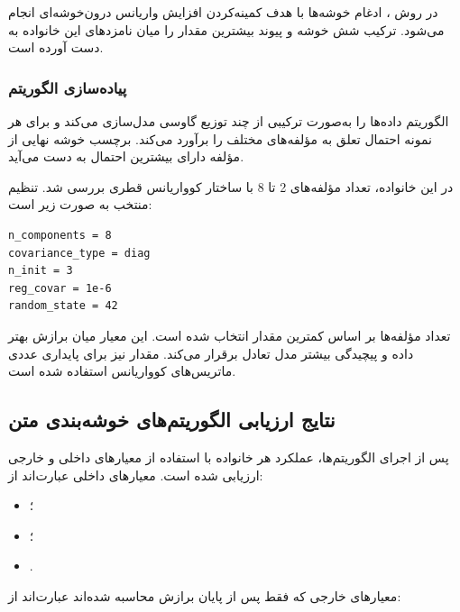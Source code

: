 \documentclass[12pt,a4paper,oneside]{report}
\begin{document}
در روش
،
ادغام خوشه‌ها با هدف کمینه‌کردن افزایش واریانس درون‌خوشه‌ای انجام می‌شود. ترکیب شش خوشه و پیوند
بیشترین مقدار
را میان نامزدهای این خانواده به دست آورده است.


\subsubsection{پیاده‌سازی الگوریتم }

الگوریتم
داده‌ها را به‌صورت ترکیبی از چند توزیع گاوسی مدل‌سازی می‌کند و برای هر نمونه احتمال تعلق به مؤلفه‌های مختلف را برآورد می‌کند. برچسب خوشه نهایی از مؤلفه دارای بیشترین احتمال به دست می‌آید.

در این خانواده، تعداد مؤلفه‌های 2 تا 8 با ساختار کوواریانس قطری بررسی شد. تنظیم منتخب به صورت زیر است:

\begin{latin}
\begin{verbatim}
n_components = 8
covariance_type = diag
n_init = 3
reg_covar = 1e-6
random_state = 42
\end{verbatim}
\end{latin}

تعداد مؤلفه‌ها بر اساس کمترین مقدار
انتخاب شده است. این معیار میان برازش بهتر داده و پیچیدگی بیشتر مدل تعادل برقرار می‌کند. مقدار
نیز برای پایداری عددی ماتریس‌های کوواریانس استفاده شده است.


\subsection{نتایج ارزیابی الگوریتم‌های خوشه‌بندی متن}

پس از اجرای الگوریتم‌ها، عملکرد هر خانواده با استفاده از معیارهای داخلی و خارجی ارزیابی شده است. معیارهای داخلی عبارت‌اند از:

\begin{itemize}
	\item {}؛
	\item {}؛
	\item {}.
\end{itemize}

معیارهای خارجی که فقط پس از پایان برازش محاسبه شده‌اند عبارت‌اند از:
\end{document}
